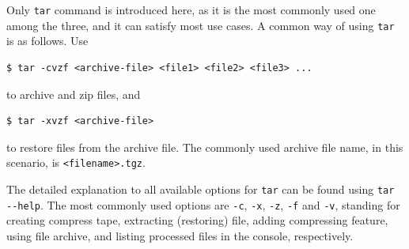 Only \verb|tar| command is introduced here, as it is the most commonly used one among the three, and it can satisfy most use cases. A common way of using \verb|tar| is as follows. Use
\begin{lstlisting}
$ tar -cvzf <archive-file> <file1> <file2> <file3> ...
\end{lstlisting}
to archive and zip files, and
\begin{lstlisting}
$ tar -xvzf <archive-file>
\end{lstlisting}
to restore files from the archive file. The commonly used archive file name, in this scenario, is \verb|<filename>.tgz|.

The detailed explanation to all available options for \verb|tar| can be found using \verb|tar --help|. The most commonly used options are \verb|-c|, \verb|-x|, \verb|-z|, \verb|-f| and \verb|-v|, standing for creating compress tape, extracting (restoring) file, adding compressing feature, using file archive, and listing processed files in the console, respectively.
